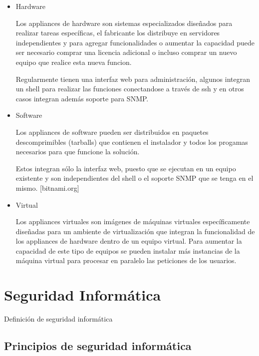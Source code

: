 \begin{itemize}

  \item Hardware
  
Los appliances de hardware son sistemas especializados dise\~{n}ados para realizar tareas espec\'{i}ficas, el fabricante los distribuye en servidores independientes y para agregar funcionalidades o aumentar la capacidad puede ser necesario comprar una licencia adicional o incluso comprar un nuevo equipo que realice esta nueva funcion.

Regularmente tienen una interfaz web para administraci\'{o}n, algunos integran un shell para realizar las funciones conectandose a trav\'{e}s de ssh y en otros casos integran adem\'{a}s soporte para SNMP.
\cite{dcd32ad713054f2f67fbcd17c0900928}

  \item Software
  
Los appliances de software pueden ser distribuidos en paquetes descomprimibles (tarballs) que contienen el instalador y todos los progamas necesarios para que funcione la soluci\'{o}n.

Estos integran s\'{o}lo la interfaz web, puesto que se ejecutan en un equipo existente y son independientes del shell o el soporte SNMP que se tenga en el mismo.
[bitnami.org]
\cite{4cb5bff4c029d86b328a2126e8a3060f}
  
  \item Virtual 

Los appliances virtuales son im\'{a}genes de m\'{a}quinas virtuales espec\'{i}ficamente dise\~{n}adas para un ambiente de virtualizaci\'{o}n que integran la funcionalidad de los appliances de hardware dentro de un equipo virtual. Para aumentar la capacidad de este tipo de equipos se pueden instalar m\'{a}s instancias de la m\'{a}quina virtual para procesar en paralelo las peticiones de los usuarios.
\cite{314f38cbb73bf967a21191775959cf1d}
  
\end{itemize}

\section {Seguridad Inform\'{a}tica}
    
Definici\'{o}n de seguridad inform\'{a}tica

  \subsection {Principios de seguridad inform\'{a}tica}

